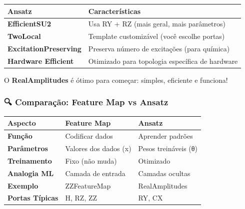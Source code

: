 \documentclass[
  brazilian,
]{report}
\newcounter{none} %
\begin{document}
{\def\LTcaptype{none} %
\begin{longtable}[]{@{}
  >{\raggedright\arraybackslash}p{}
  >{\raggedright\arraybackslash}p{}@{}}
\toprule\noalign{}
\begin{minipage}[b]{\linewidth}\raggedright
Ansatz
\end{minipage} & \begin{minipage}[b]{\linewidth}\raggedright
Características
\end{minipage} \\
\midrule\noalign{}
\endhead
\bottomrule\noalign{}
\endlastfoot
\textbf{EfficientSU2} & Usa RY + RZ (mais geral, mais parâmetros) \\
\textbf{TwoLocal} & Template customizável (você escolhe portas) \\
\textbf{ExcitationPreserving} & Preserva número de excitações (para
química) \\
\textbf{Hardware Efficient} & Otimizado para topologia específica de
hardware \\
\end{longtable}
}

O \textbf{RealAmplitudes} é ótimo para começar: simples, eficiente e
funciona!

\subsubsection{🔍 Comparação: Feature Map vs
Ansatz}\label{comparauxe7uxe3o-feature-map-vs-ansatz}

{\def\LTcaptype{none} %
\begin{longtable}[]{@{}lll@{}}
\toprule\noalign{}
Aspecto & \textbf{Feature Map} & \textbf{Ansatz} \\
\midrule\noalign{}
\endhead
\bottomrule\noalign{}
\endlastfoot
\textbf{Função} & Codificar dados & Aprender padrões \\
\textbf{Parâmetros} & Valores dos dados (x) & Pesos treináveis (θ) \\
\textbf{Treinamento} & Fixo (não muda) & Otimizado \\
\textbf{Analogia ML} & Camada de entrada & Camadas ocultas \\
\textbf{Exemplo} & ZZFeatureMap & RealAmplitudes \\
\textbf{Portas Típicas} & H, RZ, ZZ & RY, CX \\
\end{longtable}
}
\end{document}
